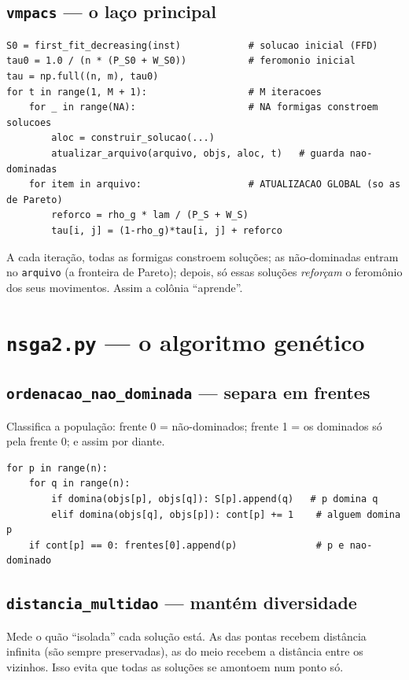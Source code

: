 \documentclass[11pt]{article}
\begin{document}
\subsection{\texttt{vmpacs} --- o laço principal}
\begin{lstlisting}
S0 = first_fit_decreasing(inst)            # solucao inicial (FFD)
tau0 = 1.0 / (n * (P_S0 + W_S0))           # feromonio inicial
tau = np.full((n, m), tau0)
for t in range(1, M + 1):                  # M iteracoes
    for _ in range(NA):                    # NA formigas constroem solucoes
        aloc = construir_solucao(...)
        atualizar_arquivo(arquivo, objs, aloc, t)   # guarda nao-dominadas
    for item in arquivo:                   # ATUALIZACAO GLOBAL (so as de Pareto)
        reforco = rho_g * lam / (P_S + W_S)
        tau[i, j] = (1-rho_g)*tau[i, j] + reforco
\end{lstlisting}
\begin{ideia}
A cada iteração, todas as formigas constroem soluções; as não-dominadas entram no
\texttt{arquivo} (a fronteira de Pareto); depois, só essas soluções
\emph{reforçam} o feromônio dos seus movimentos. Assim a colônia ``aprende''.
\end{ideia}

\section{\texttt{nsga2.py} --- o algoritmo genético}
\subsection{\texttt{ordenacao\_nao\_dominada} --- separa em frentes}
Classifica a população: frente 0 = não-dominados; frente 1 = os dominados só pela
frente 0; e assim por diante.
\begin{lstlisting}
for p in range(n):
    for q in range(n):
        if domina(objs[p], objs[q]): S[p].append(q)   # p domina q
        elif domina(objs[q], objs[p]): cont[p] += 1    # alguem domina p
    if cont[p] == 0: frentes[0].append(p)              # p e nao-dominado
\end{lstlisting}

\subsection{\texttt{distancia\_multidao} --- mantém diversidade}
Mede o quão ``isolada'' cada solução está. As das pontas recebem distância
infinita (são sempre preservadas), as do meio recebem a distância entre os
vizinhos. Isso evita que todas as soluções se amontoem num ponto só.
\end{document}
